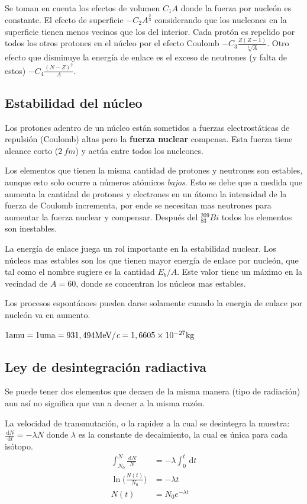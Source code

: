 \documentclass[10pt,twocolumn,titlepage]{article}
\newcommand{\lspeed}{\textit{\textrm{c}}}
\newcommand{\di}{\,\textrm{d}}
\begin{document}
Se toman en cuenta los efectos de volumen  $C_1A$ donde la fuerza por nucleón es constante. El efecto de superficie $-C_2A^{\frac{2}{3}}$ considerando que los nucleones en la superficie tienen menos vecinos que los del interior. Cada protón es repelido por todos los otros protones en el núcleo por el efecto Coulomb $-C_3\frac{Z(Z-1)}{\sqrt[3]{A}}$. Otro efecto que disminuye la energía de enlace es el exceso de neutrones (y falta de estos) $-C_4\frac{(N-Z)^2}{A}$.

\subsection{Estabilidad del núcleo}
Los protones adentro de un núcleo están sometidos a fuerzas electrostáticas de repulsión (Coulomb) altas pero la \textbf{fuerza nuclear} compensa. Esta fuerza tiene alcance corto ($\SI{2}{fm}$) y actúa entre todos los nucleones.

Los elementos que tienen la misma cantidad de protones y neutrones son estables, aunque esto solo ocurre a números atómicos \emph{bajos}. Esto se debe que a medida que aumenta la cantidad de protones y electrones en un átomo la intensidad de la fuerza de Coulomb incrementa, por ende se necesitan mas neutrones para aumentar la fuerza nuclear y compensar. Después del $^{209}_{83}Bi$ todos los elementos son inestables.

La energía de enlace juega un rol importante en la estabilidad nuclear. Los núcleos mas estables son los que tienen mayor energía de enlace por nucleón, que tal como el nombre sugiere es la cantidad $E_b/A$. Este valor tiene un máximo en la vecindad de $A=60$, donde se concentran los núcleos mas estables.


Los procesos espontánoes pueden darse solamente cuando la energia de enlace por nucleón va en aumento.

$1 \si{amu}=1 \si{uma} = 931,494 \si{MeV/\lspeed}=1,6605\times10^{-27}\si{kg}$

\subsection{Ley de desintegración radiactiva}

Se puede tener dos elementos que decaen de la misma manera (tipo de radiación) aun así no significa que van a decaer a la misma razón. 

La velocidad de transmutación, o la rapidez a la cual se desintegra la muestra:
$\frac{\di N}{\di t}=-\lambda N$ donde $\lambda$ es la constante de decaimiento, la cual es única para cada isótopo.
\begin{align*}
\int^N_{N_0}\frac{\di N}{N}&=-\lambda \int^t_0 \di t \\
\ln \bigg(\frac{N(t)}{N_0}\bigg) &= -\lambda t \\
N(t)&=N_0e^{-\lambda t} 
\end{align*}
\end{document}
